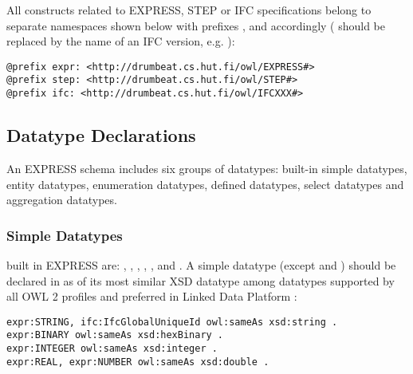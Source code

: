 All constructs related to EXPRESS, STEP or IFC specifications belong to separate namespaces shown below with prefixes ,  and  accordingly ( should be replaced by the name of an IFC version, e.g. ):

\begin{lstlisting}
@prefix expr: <http://drumbeat.cs.hut.fi/owl/EXPRESS#>
@prefix step: <http://drumbeat.cs.hut.fi/owl/STEP#>
@prefix ifc: <http://drumbeat.cs.hut.fi/owl/IFCXXX#>
\end{lstlisting}




\subsection{Datatype Declarations}
\label{subsec:ifcOWL-types}

An EXPRESS schema includes six groups of data\-types: built-in simple data\-types, entity data\-types, enumeration data\-types, defined data\-types, select data\-types and aggregation data\-types.



\subsubsection{Simple Datatypes} built in EXPRESS are: , , , , ,  and . A simple data\-type (except  and ) should be declared in \ifcowl{} as  of its most similar XSD data\-type among data\-types supported by all OWL 2 profiles \cite{motik2012owl} and preferred in Linked Data Platform \cite{ldp-best-practices}:

\begin{lstlisting}
expr:STRING, ifc:IfcGlobalUniqueId owl:sameAs xsd:string .
expr:BINARY owl:sameAs xsd:hexBinary .
expr:INTEGER owl:sameAs xsd:integer .
expr:REAL, expr:NUMBER owl:sameAs xsd:double .
\end{lstlisting}


